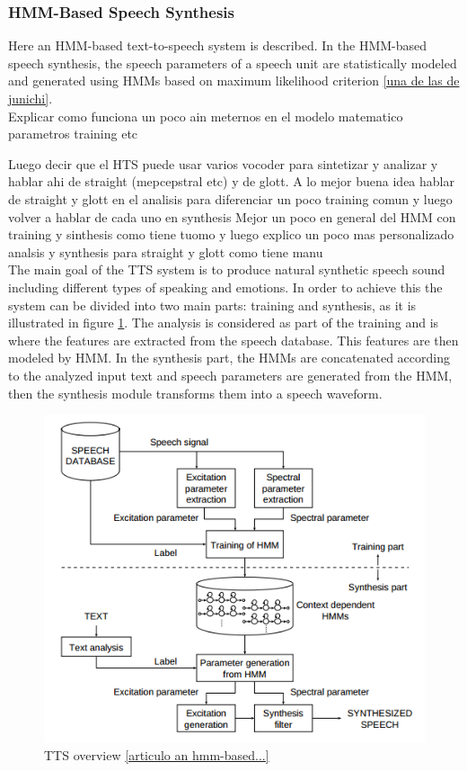 \subsubsection{HMM-Based Speech Synthesis}\label{hmmbased}
Here an HMM-based text-to-speech system is described. In the HMM-based speech synthesis, the speech parameters of a speech unit are statistically modeled and generated using HMMs based on maximum likelihood criterion \ref{una de las de junichi}.\\

Explicar como funciona un poco ain meternos en el modelo matematico parametros training etc

Luego decir que el HTS puede usar varios vocoder para sintetizar y analizar y hablar ahi de straight (mepcepstral etc) y de glott.
 A lo mejor buena idea hablar de straight y glott en el analisis para diferenciar un poco training comun y luego volver a hablar de cada uno en synthesis
 Mejor un poco en general del HMM con training y sinthesis como tiene tuomo y luego explico un poco mas personalizado analsis y synthesis para straight y glott como tiene manu\\
 
The main goal of the TTS system is to produce natural synthetic speech sound including different types of speaking and emotions. In order to achieve this the system can be divided into two main parts: training and synthesis, as it is illustrated in figure \ref{ttsstruct}. The analysis is considered as part of the training and is where the features are extracted from the speech database. This features are then modeled by HMM. In the synthesis part, the HMMs are concatenated according to the analyzed input text and speech parameters are generated from the HMM, then the synthesis module transforms them into a speech waveform.\\
\begin{figure}[!htb]
	\begin{center}
	\includegraphics[width=1\textwidth]{img/ttsstruct.png}
	\end{center}
	\caption{\label{ttsstruct}TTS overview \ref{articulo an hmm-based...}}
\end{figure}
